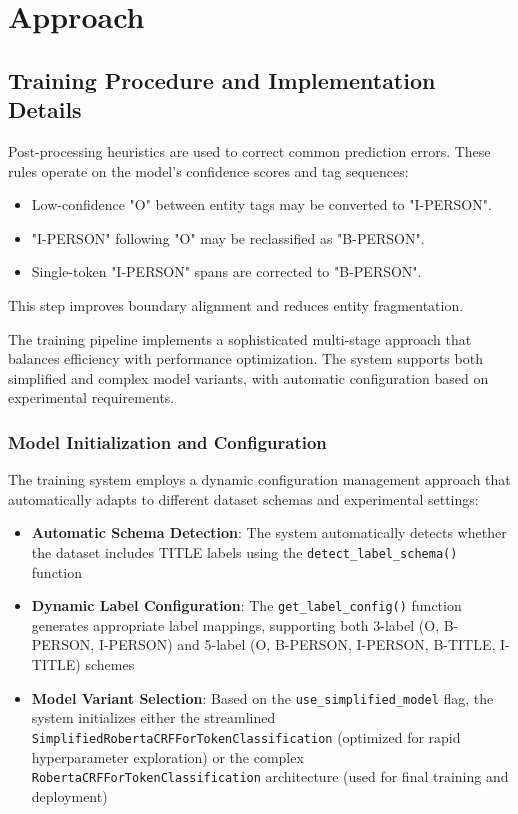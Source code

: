 \documentclass[a4paper]{usiinfbachelorproject}
\begin{document}
\section{Approach}

\subsection{Training Procedure and Implementation Details}

Post-processing heuristics are used to correct common prediction errors. These rules operate on the model’s confidence scores and tag sequences:

\begin{itemize}
    \item Low-confidence "O" between entity tags may be converted to "I-PERSON".
    \item "I-PERSON" following "O" may be reclassified as "B-PERSON".
    \item Single-token "I-PERSON" spans are corrected to "B-PERSON".
\end{itemize}

This step improves boundary alignment and reduces entity fragmentation.

The training pipeline implements a sophisticated multi-stage approach that balances efficiency with performance optimization. The system supports both simplified and complex model variants, with automatic configuration based on experimental requirements.

\subsubsection{Model Initialization and Configuration}

The training system employs a dynamic configuration management approach that automatically adapts to different dataset schemas and experimental settings:

\begin{itemize}
    \item \textbf{Automatic Schema Detection}: The system automatically detects whether the dataset includes TITLE labels using the \texttt{detect\_label\_schema()} function
    \item \textbf{Dynamic Label Configuration}: The \texttt{get\_label\_config()} function generates appropriate label mappings, supporting both 3-label (O, B-PERSON, I-PERSON) and 5-label (O, B-PERSON, I-PERSON, B-TITLE, I-TITLE) schemes
    \item \textbf{Model Variant Selection}: Based on the \texttt{use\_simplified\_model} flag, the system initializes either the streamlined \texttt{SimplifiedRobertaCRFForTokenClassification} (optimized for rapid hyperparameter exploration) or the complex \texttt{RobertaCRFForTokenClassification} architecture (used for final training and deployment)
\end{itemize}
\end{document}
